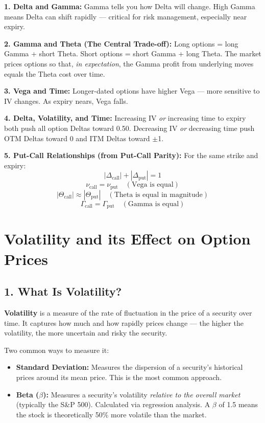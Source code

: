 \documentclass[12pt,openany]{book}
\begin{document}
\textbf{1. Delta and Gamma:}
Gamma tells you how Delta will change. High Gamma means Delta can shift rapidly — critical for risk management, especially near expiry.

\textbf{2. Gamma and Theta (The Central Trade-off):}
Long options = long Gamma + short Theta. Short options = short Gamma + long Theta.
The market prices options so that, \emph{in expectation}, the Gamma profit from underlying moves equals the Theta cost over time.

\textbf{3. Vega and Time:}
Longer-dated options have higher Vega — more sensitive to IV changes. As expiry nears, Vega falls.

\textbf{4. Delta, Volatility, and Time:}
Increasing IV \emph{or} increasing time to expiry both push all option Deltas toward 0.50.
Decreasing IV \emph{or} decreasing time push OTM Deltas toward 0 and ITM Deltas toward \(\pm\)1.

\textbf{5. Put-Call Relationships (from Put-Call Parity):}
For the same strike and expiry:
\[
|\Delta_{\text{call}}| + |\Delta_{\text{put}}| = 1
\]
\[
\nu_{\text{call}} = \nu_{\text{put}} \quad (\text{Vega is equal})
\]
\[
|\Theta_{\text{call}}| \approx |\Theta_{\text{put}}| \quad (\text{Theta is equal in magnitude})
\]
\[
\Gamma_{\text{call}} = \Gamma_{\text{put}} \quad (\text{Gamma is equal})
\]

\section{Volatility and its Effect on Option Prices}

\subsection{1. What Is Volatility?}

\textbf{Volatility} is a measure of the rate of fluctuation in the price of a security over time. It captures how much and how rapidly prices change — the higher the volatility, the more uncertain and risky the security.

Two common ways to measure it:

\begin{itemize}[leftmargin=*]
    \item \textbf{Standard Deviation:} Measures the dispersion of a security's historical prices around its mean price. This is the most common approach.
    \item \textbf{Beta (\(\beta\)):} Measures a security's volatility \emph{relative to the overall market} (typically the S\&P 500). Calculated via regression analysis. A \(\beta\) of 1.5 means the stock is theoretically 50\% more volatile than the market.
\end{itemize}
\end{document}
